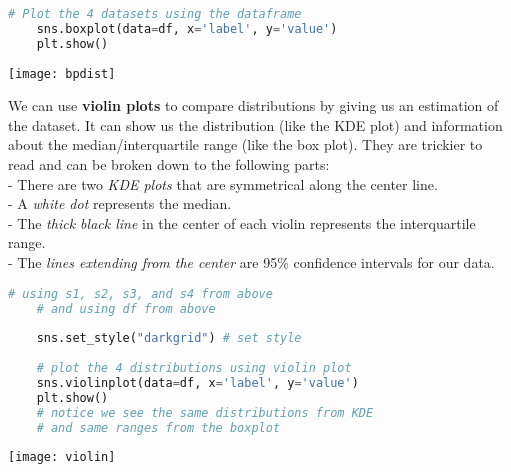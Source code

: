 \documentclass[11pt, a4paper]{article}
\begin{document}
\begin{spacing}{1.1}
\begin{minipage}[c]{10.3cm}
\begin{lstlisting}[language=Python]
	# Plot the 4 datasets using the dataframe
	sns.boxplot(data=df, x='label', y='value')
	plt.show()	\end{lstlisting}\vspace*{1mm}
	\end{minipage}
	\begin{minipage}[c]{10cm}
	\texttt{[image: bpdist]}
	\end{minipage} \newpage
	\noindent We can use \textbf{violin plots} to compare distributions by giving us an estimation of the dataset. It can show us the distribution (like the KDE plot) and information about the median/interquartile range (like the box plot). They are trickier to read and can be broken down to the following parts: \\
	\hspace*{3mm} - There are two \textit{KDE plots} that are symmetrical along the center line. \\
	\hspace*{3mm} - A \textit{white dot} represents the median. \\
	\hspace*{3mm} - The \textit{thick black line} in the center of each violin represents the interquartile range. \\
	\hspace*{3mm} - The \textit{lines extending from the center} are 95\% confidence intervals for our data. \\
	\begin{minipage}[c]{10.3cm}
	\begin{lstlisting}[language=Python]
	# using s1, s2, s3, and s4 from above
	# and using df from above
	
	sns.set_style("darkgrid") # set style
	
	# plot the 4 distributions using violin plot
	sns.violinplot(data=df, x='label', y='value')
	plt.show()
	# notice we see the same distributions from KDE
	# and same ranges from the boxplot \end{lstlisting}\vspace*{1mm}
	\end{minipage}
	\begin{minipage}[c]{10cm}
		\texttt{[image: violin]}
	\end{minipage} \\


\end{spacing}
\end{document}
